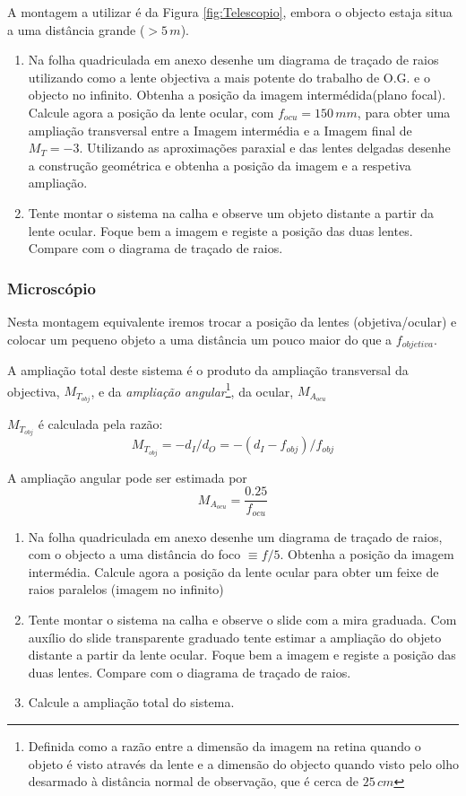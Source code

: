 \documentclass[a4paper,12pt]{article}      %
\begin{document}
A montagem  a utilizar é da Figura \ref{fig:Telescopio}, embora o objecto estaja situa a uma distância grande ($> 5 \, m$). 


\begin{enumerate}
\item Na folha quadriculada em anexo desenhe um diagrama de traçado de raios utilizando como a lente objectiva a mais potente do trabalho de O.G.  e o objecto no infinito. Obtenha a posição da imagem intermédida(plano focal). Calcule agora a posição da lente ocular, com $f_{ocu}=150\,mm$, para obter uma ampliação transversal entre a Imagem intermédia e a Imagem final de $M_T=-3$. Utilizando as aproximações paraxial e das lentes delgadas desenhe a construção geométrica e obtenha a posição da imagem e a respetiva ampliação.
\item Tente montar o sistema na calha e observe um objeto distante a partir da lente ocular. Foque bem a imagem e registe a posição das duas lentes. Compare com o diagrama de traçado de raios.
\end{enumerate}

\subsubsection{\sf  Microscópio}

Nesta montagem equivalente iremos trocar a posição da lentes (objetiva/ocular) e colocar um pequeno objeto a uma distância um pouco maior do que a $f_{objetiva}$. 

A ampliação total deste sistema é o produto da ampliação transversal da objectiva, $M_{T_{obj}}$,  e da \emph{ampliação angular}\footnote{Definida como a razão entre a dimensão da imagem na retina quando o objeto é visto através da lente e a dimensão do objecto quando visto pelo olho desarmado à distância normal de observação, que é cerca de $25\,cm$}, da ocular, $M_{A_{ocu}}$ 
 
$M_{T_{obj}}$ é calculada pela razão:
$$M_{T_{obj}}=-d_I/d_O=-(d_I - f_{obj})/f_{obj}$$

A ampliação angular pode ser estimada por 
$$M_{A_{ocu}}= \frac{0.25}{f_{ocu}}$$

\begin{enumerate}
\item Na folha quadriculada em anexo desenhe um diagrama de traçado de raios, com o objecto a uma distância do foco $\equiv f/5$. Obtenha a posição da imagem intermédia. Calcule agora a posição da lente ocular para obter um feixe de raios paralelos (imagem no infinito)
\item Tente montar o sistema na calha e observe o slide com a mira graduada. Com auxílio do slide transparente graduado tente estimar a ampliação do  objeto distante a partir da lente ocular. Foque bem a imagem e registe a posição das duas lentes. Compare com o diagrama de traçado de raios.
\item Calcule a ampliação total do sistema.
\end{enumerate}
\end{document}
